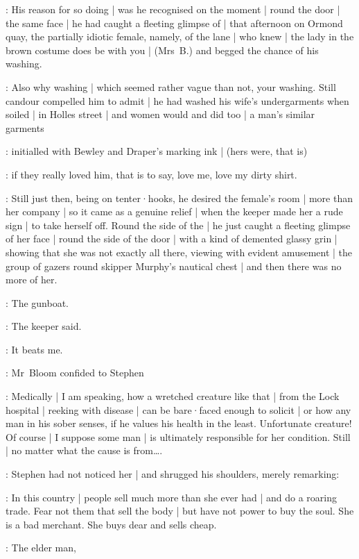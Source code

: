 :
His reason for so doing |
was he recognised on the moment |
round the door |
the same face |
he had caught a fleeting glimpse of |
that afternoon on Ormond quay,
the partially idiotic female,
namely,
of the lane |
who knew |
the lady in the brown costume does be with you |
(Mrs~B.)
and begged the chance of his washing.

:
Also why washing |
which seemed rather vague than not,
your washing.
Still candour compelled him to admit |
he had washed his wife's undergarments when soiled |
in Holles street |
and women would and did too |
a man's similar garments

:
initialled with Bewley and Draper's marking ink |
(hers were,
that is)

:
if they really loved him,
that is to say,
love me,
love my dirty shirt.

:
Still just then,
being on tenter·hooks,
he desired the female's room |
more than her company |
so it came as a genuine relief |
when the keeper made her a rude sign |
to take herself off.
Round the side of the  |
he just caught a fleeting glimpse of her face |
round the side of the door |
with a kind of demented glassy grin |
showing that she was not exactly all there,
viewing with evident amusement |
the group of gazers round skipper Murphy's nautical chest |
and then there was no more of her.

\SkinTheGoat:
The gunboat.

:
The keeper said.

\Bloom:
It beats me.

:
Mr~Bloom confided to Stephen

\Bloom:
Medically |
I am speaking,
how a wretched creature like that |
from the Lock hospital |
reeking with disease |
can be bare·faced enough to solicit |
or how any man in his sober senses,
if he values his health in the least.
Unfortunate creature!
Of course |
I suppose some man |
is ultimately responsible for her condition.
Still |
no matter what the cause is from\ldots.

:
Stephen had not noticed her |
and shrugged his shoulders,
merely remarking:

\Stephen:
In this country |
people sell much more than she ever had |
and do a roaring trade.
Fear not them that sell the body |
but have not power to buy the soul.
She is a bad merchant.
She buys dear and sells cheap.

:
The elder man,

